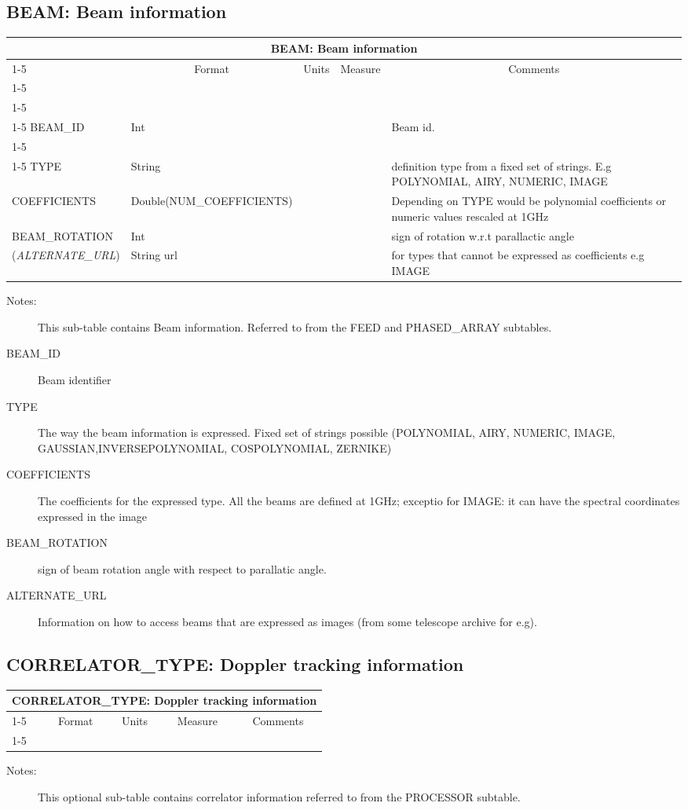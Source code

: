 \documentclass{article}
\newcommand{\defline}[1]{\cline{1-5}
\multicolumn{5}{|l|}{#1} \\
\cline{1-5}}
\newcommand{\definetable}[2]
{
	\vfill\newpage
	\subsection{#1}
        \vspace{0.15in}
        \small
	\begin{tabular}{|l|p{1.25in}|l|p{.9in}|p{1.4in}|}
	\hline
	\multicolumn{5}{|c|}{\bf #1}\\ 
	\cline{1-5}
        \multicolumn{1}{|c|}{Name}&\multicolumn{1}{|c|}{Format}&
        \multicolumn{1}{|c|}{Units}&\multicolumn{1}{|c|}{Measure}&
        \multicolumn{1}{|c|}{Comments}\\
        \cline{1-5}
        #2
        \hline
	\end{tabular}
}
\begin{document}
\definetable{BEAM: Beam  information}{
\defline{\bf Columns}
\defline{\em Key}
BEAM\_ID  & Int & & & Beam id.\\
\defline{\em Data}
TYPE & String & & &  definition type from a fixed set of strings. E.g POLYNOMIAL, AIRY, NUMERIC, IMAGE  \\
COEFFICIENTS & Double(NUM\_COEFFICIENTS) &  &  & Depending on TYPE would be polynomial coefficients or numeric values rescaled at 1GHz \\
BEAM\_ROTATION & Int &  & & sign of rotation w.r.t parallactic angle\\
({\it ALTERNATE\_URL}) & String  url  & & & for types that cannot be expressed as coefficients e.g IMAGE\\

}
\begin{description}

\item[Notes:] This sub-table contains Beam information. Referred to from the FEED and PHASED\_ARRAY subtables.

\item[BEAM\_ID] Beam identifier

\item[TYPE] The way the beam information is expressed. Fixed set of strings possible (POLYNOMIAL, AIRY, NUMERIC, IMAGE, GAUSSIAN,INVERSEPOLYNOMIAL, COSPOLYNOMIAL,  ZERNIKE)

\item[COEFFICIENTS] The coefficients for the expressed type. All the beams are defined at 1GHz; exceptio for IMAGE: it can have the spectral coordinates expressed in the image

\item[BEAM\_ROTATION] sign of beam rotation angle with respect to parallatic angle.

\item[ALTERNATE\_URL] Information on how to access beams that are expressed as images (from some telescope archive for e.g).

\end{description}
\definetable{CORRELATOR\_TYPE: Doppler tracking information}{

}
\begin{description}

\item[Notes:] This optional sub-table contains correlator information referred to from the PROCESSOR subtable.

\end{description}
\end{document}
